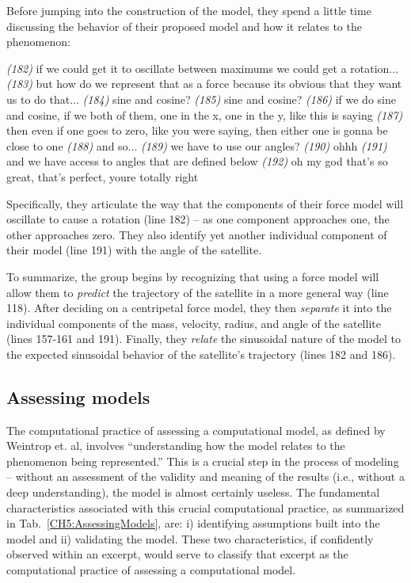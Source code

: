 \documentclass{msuphddissertation}
\begin{document}
\begin{doublespace}
Before jumping into the construction of the model, they spend a little time discussing the behavior of their proposed model and how it relates to the phenomenon: \begin{description}
\SD \textit{(182)} if we could get it to oscillate between maximums we could get a rotation...
\SD \textit{(183)} but how do we represent that as a force because its obvious that they want us to do that...
\SA \textit{(184)} sine and cosine?
\SD \textit{(185)} sine and cosine?
\SA \textit{(186)} if we do sine and cosine, if we both of them, one in the x, one in the y, like this is saying
\SA \textit{(187)} then even if one goes to zero, like you were saying, then either one is gonna be close to one
\SA \textit{(188)} and so...
\SD \textit{(189)} we have to use our angles?
\SC \textit{(190)} ohhh
\SD \textit{(191)} and we have access to angles {that are defined below}
\SD \textit{(192)} oh my god that’s so great, that’s perfect, youre totally right
\end{description}  Specifically, they articulate the way that the components of their force model will oscillate to cause a rotation (line 182) -- as one component approaches one, the other approaches zero.  They also identify yet another individual component of their model (line 191) with the angle of the satellite.

To summarize, the group begins by recognizing that using a force model will allow them to \textit{predict} the trajectory of the satellite in a more general way (line 118).  After deciding on a centripetal force model, they then \textit{separate} it into the individual components of the mass, velocity, radius, and angle of the satellite (lines 157-161 and 191).  Finally, they \textit{relate} the sinusoidal nature of the model to the expected sinusoidal behavior of the satellite's trajectory (lines 182 and 186).

%
%
%
%
%
%
%
%
%
%
%
%
%
%
%
%

\subsection{Assessing models}

The computational practice of assessing a computational model, as defined by Weintrop et. al, involves ``understanding how the model relates to the phenomenon being represented.''  This is a crucial step in the process of modeling -- without an assessment of the validity and meaning of the results (i.e., without a deep understanding), the model is almost certainly useless.  The fundamental characteristics associated with this crucial computational practice, as summarized in Tab.~\ref{CH5:AssessingModels}, are: i) identifying assumptions built into the model and ii) validating the model.  These two characteristics, if confidently observed within an excerpt, would serve to classify that excerpt as the computational practice of assessing a computational model.


\end{doublespace}
\end{document}
